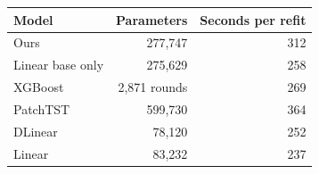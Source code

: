 \begin{tabular}{lrr}
\toprule
Model & Parameters & Seconds per refit \\
\midrule
Ours & 277,747 & 312 \\
Linear base only & 275,629 & 258 \\
XGBoost & 2,871 rounds & 269 \\
PatchTST & 599,730 & 364 \\
DLinear & 78,120 & 252 \\
Linear & 83,232 & 237 \\
\bottomrule
\end{tabular}
